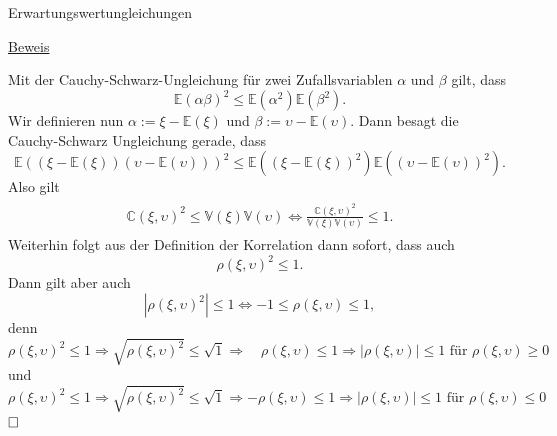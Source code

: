 \documentclass[
  8pt,
  ignorenonframetext,
]{beamer}
\newcommand{\ups}{\upsilon}
\begin{document}
\begin{frame}{Erwartungswertungleichungen}
\protect\hypertarget{erwartungswertungleichungen-2}{}
\footnotesize

\underline{Beweis}

Mit der Cauchy-Schwarz-Ungleichung für zwei Zufallsvariablen \(\alpha\)
und \(\beta\) gilt, dass \begin{equation}
\mathbb{E}(\alpha\beta)^2 \le \mathbb{E}\left(\alpha^2\right)\mathbb{E}\left(\beta^2\right).
\end{equation} Wir definieren nun \(\alpha := \xi -\mathbb{E}(\xi)\) und
\(\beta := \ups - \mathbb{E}(\ups)\). Dann besagt die Cauchy-Schwarz
Ungleichung gerade, dass \begin{equation}
\mathbb{E}\left((\xi -\mathbb{E}(\xi))(\ups-\mathbb{E}(\ups))\right)^2
\le  \mathbb{E}\left((\xi -\mathbb{E}(\xi))^2 \right) \mathbb{E}\left((\ups-\mathbb{E}(\ups))^2 \right).
\end{equation} Also gilt \begin{align}
\begin{split}
\mathbb{C}(\xi,\ups)^2
\le  \mathbb{V}(\xi)\mathbb{V}(\ups)
\Leftrightarrow \frac{\mathbb{C}(\xi,\ups)^2}{\mathbb{V}(\xi)\mathbb{V}(\ups)}
\le 1.
\end{split}
\end{align} Weiterhin folgt aus der Definition der Korrelation dann
sofort, dass auch \begin{equation}
\rho(\xi,\ups)^2 \le 1.
\end{equation} Dann gilt aber auch \begin{equation}
|\rho(\xi,\ups)^2| \le 1 \Leftrightarrow -1 \le \rho(\xi,\ups) \le 1,
\end{equation} denn \begin{equation}
\rho(\xi,\ups)^2 \le 1 \Rightarrow \sqrt{\rho(\xi,\ups)^2} \le \sqrt{1} \Rightarrow \quad\rho(\xi,\ups)  \le 1 \Rightarrow |\rho(\xi,\ups)| \le 1 \mbox{ für } \rho(\xi,\ups) \ge 0
\end{equation} und \begin{equation}
\rho(\xi,\ups)^2 \le 1 \Rightarrow \sqrt{\rho(\xi,\ups)^2} \le \sqrt{1} \Rightarrow     -\rho(\xi,\ups) \le 1 \Rightarrow |\rho(\xi,\ups)| \le 1 \mbox{ für } \rho(\xi,\ups) \le 0
\end{equation} \(\hfill \Box\)
\end{frame}
\end{document}
